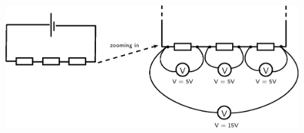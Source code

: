 	\begin{figure}[H] %
    \begin{center}
    \label{m38776*id64102!!!underscore!!!media}\label{m38776*id64102!!!underscore!!!printimage}\includegraphics{col11305.imgs/m38776_PG10C9_019.png} %
      \vspace{2pt}
    \vspace{.1in}
    \end{center}
 \end{figure}       
        \par 
\label{m38776*uid25342}
